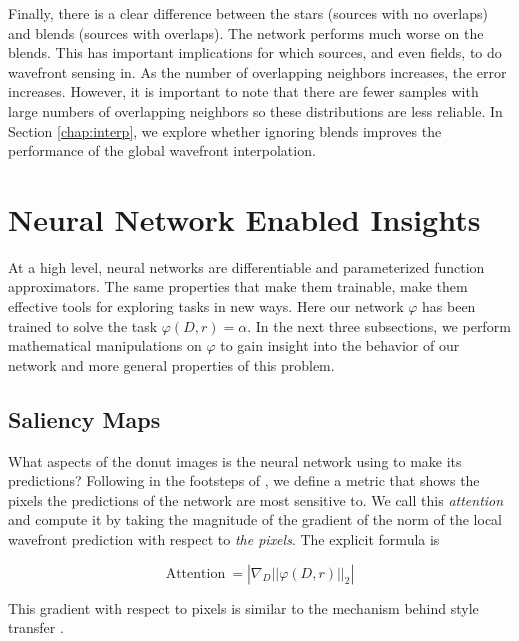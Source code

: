Finally, there is a clear difference between the stars (sources with no overlaps) and blends (sources with overlaps). The network performs much worse on the blends. This has important implications for which sources, and even fields, to do wavefront sensing in. As the number of overlapping neighbors increases, the error increases. However, it is important to note that there are fewer samples with large numbers of overlapping neighbors so these distributions are less reliable. In Section \ref{chap:interp}, we explore whether ignoring blends improves the performance of the global wavefront interpolation.

\section{Neural Network Enabled Insights}

At a high level, neural networks are differentiable and parameterized function approximators. The same properties that make them trainable, make them effective tools for exploring tasks in new ways. Here our network $\varphi$ has been trained to solve the task $\varphi(D, r) = \alpha$. In the next three subsections, we perform mathematical manipulations on $\varphi$ to gain insight into the behavior of our network and more general properties of this problem.

\subsection{Saliency Maps}

What aspects of the donut images is the neural network using to make its predictions? Following in the footsteps of \cite{saliency}, we define a metric that shows the pixels the predictions of the network are most sensitive to. We call this \textit{attention} and compute it by taking the magnitude of the gradient of the norm of the local wavefront prediction with respect to \textit{the pixels}. The explicit formula is

\begin{equation*}
\text{Attention}\ = \left|\nabla_D || \varphi(D, r)||_2 \right|
\end{equation*}

\noindent This gradient with respect to pixels is similar to the mechanism behind style transfer \cite{style_transfer}. 

